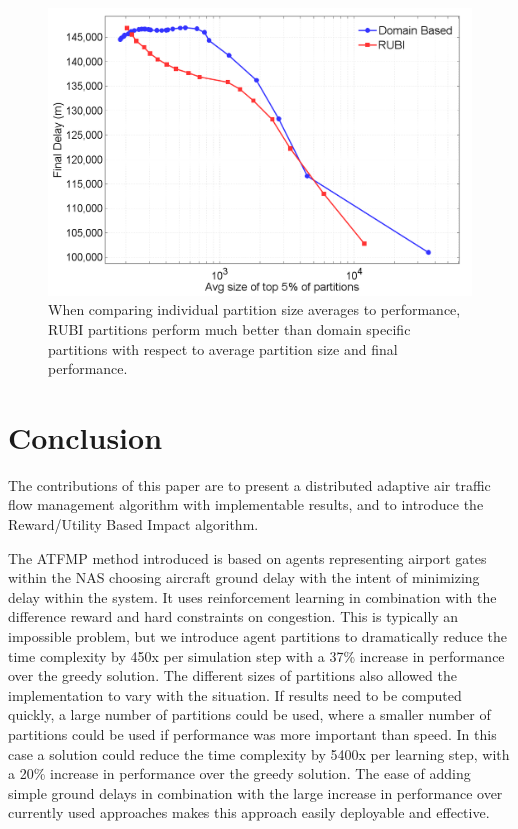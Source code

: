\documentclass[onehalf,11pt]{beavtex}
\begin{document}
\begin{figure}
\centering
\includegraphics[width=1.0\columnwidth]{ATFMPPerformancevsAvgSize}
\caption{When comparing individual partition size averages to performance, RUBI partitions perform much better than domain specific partitions with respect to average partition size and final performance.}
\label{ATFMPPerformancevsAvgSize}
\end{figure}

\chapter{Conclusion}
The contributions of this paper are to present a distributed adaptive air traffic flow management algorithm with implementable results, and to introduce the Reward/Utility Based Impact algorithm. 

The ATFMP method introduced is based on agents representing airport gates within the NAS choosing aircraft ground delay with the intent of minimizing delay within the system. It uses reinforcement learning in combination with the difference reward and hard constraints on congestion. This is typically an impossible problem, but we introduce agent partitions to dramatically reduce the time complexity by  450x per simulation step with a 37\% increase in performance over the greedy solution. The different sizes of partitions also allowed the implementation to vary with the situation. If results need to be computed quickly, a large number of partitions could be used, where a smaller number of partitions could be used if performance was more important than speed. In this case a solution could reduce the time complexity by 5400x per learning step, with a 20\% increase in performance over the greedy solution. The ease of adding simple ground delays in combination with the large increase in performance over currently used approaches makes this approach easily deployable and effective.
\end{document}
